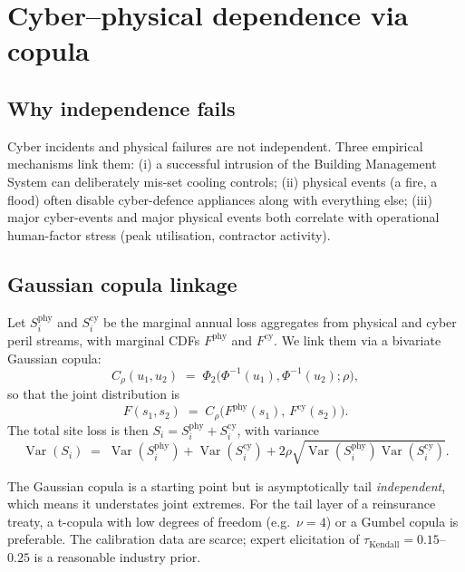\documentclass[11pt,a4paper]{article}
\let\origsection\section
\renewcommand{\section}{\clearpage\origsection}
\theoremstyle{ia}
\newcommand{\Var}{\operatorname{Var}}
\newcommand{\1}{\mathbf{1}}
\begin{document}
\section{Cyber--physical dependence via copula}\label{sec:dependence}

\subsection{Why independence fails}

Cyber incidents and physical failures are not independent. Three
empirical mechanisms link them: (i) a successful intrusion of the
Building Management System can deliberately mis-set cooling
controls; (ii) physical events (a fire, a flood) often disable
cyber-defence appliances along with everything else; (iii) major
cyber-events and major physical events both correlate with
operational human-factor stress (peak utilisation, contractor
activity).

\subsection{Gaussian copula linkage}

Let $S^{\mathrm{phy}}_i$ and $S^{\mathrm{cy}}_i$ be the marginal annual
loss aggregates from physical and cyber peril streams, with marginal
CDFs $F^{\mathrm{phy}}$ and $F^{\mathrm{cy}}$. We link them via a
bivariate Gaussian copula:
\begin{equation}\label{eq:copula}
   C_\rho(u_1,u_2) \;=\; \Phi_2\bigl(\Phi^{-1}(u_1),\Phi^{-1}(u_2);\rho\bigr),
\end{equation}
so that the joint distribution is
\begin{equation}
   F(s_1,s_2) \;=\; C_\rho\bigl(F^{\mathrm{phy}}(s_1),\,F^{\mathrm{cy}}(s_2)\bigr).
\end{equation}
The total site loss is then $S_i = S^{\mathrm{phy}}_i + S^{\mathrm{cy}}_i$,
with variance
\begin{equation}\label{eq:totalvar}
   \Var(S_i) \;=\; \Var(S^{\mathrm{phy}}_i) + \Var(S^{\mathrm{cy}}_i)
                 + 2\rho\sqrt{\Var(S^{\mathrm{phy}}_i)\Var(S^{\mathrm{cy}}_i)} .
\end{equation}

\begin{rbox}
The Gaussian copula is a starting point but is asymptotically tail
\emph{independent}, which means it understates joint extremes. For the
tail layer of a reinsurance treaty, a t-copula with low degrees of
freedom (e.g.\ $\nu=4$) or a Gumbel copula is preferable. The
calibration data are scarce; expert elicitation of
$\tau_{\mathrm{Kendall}}=0.15$--$0.25$ is a reasonable industry prior.
\end{rbox}
\end{document}
